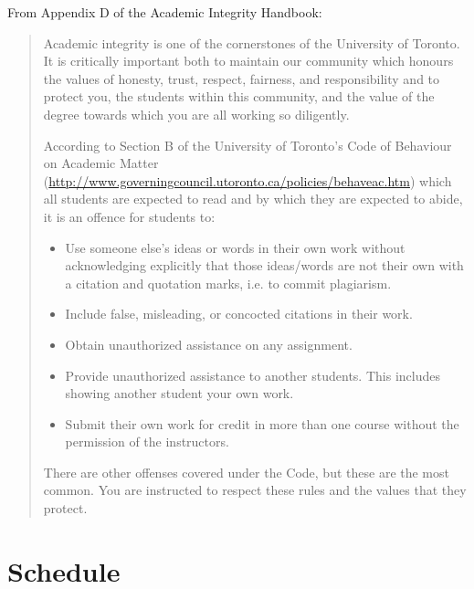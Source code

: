 \documentclass{article}
\begin{document}
From Appendix D of the Academic Integrity Handbook:
\begin{quote}
  Academic integrity is one of the cornerstones of the University of
  Toronto. It is critically important both to maintain our community
  which honours the values of honesty, trust, respect, fairness, and
  responsibility and to protect you, the students within this
  community, and the value of the degree towards which you are all
  working so diligently.  

  According to Section B of the University of
  Toronto's Code of Behaviour on Academic Matter
  (\url{http://www.governingcouncil.utoronto.ca/policies/behaveac.htm})
  which all students are expected to read and by which they are
  expected to abide, it is an offence for students to:
  \begin{itemize}
    \item Use someone else's ideas or words in their own work without
      acknowledging explicitly that those ideas/words are not their
      own with a citation and quotation marks, i.e. to commit
      plagiarism.
  \item Include false, misleading, or concocted citations in their
    work.
  \item Obtain unauthorized assistance on any assignment. 
  \item Provide unauthorized assistance to another students. This
    includes showing another student your own work.
  \item Submit their own work for credit in more than one course
      without the permission of the instructors.
  \end{itemize}

  There are other offenses covered under the Code, but these are the
  most common. You are instructed to respect these rules and the
  values that they protect.
\end{quote}

\newpage

\section*{Schedule}
\end{document}
